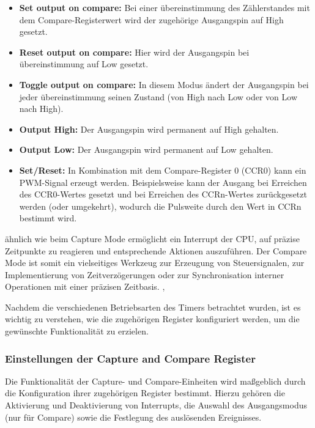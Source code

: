 \begin{itemize}
	\item \textbf{Set output on compare:} Bei einer \"ubereinstimmung des Z\"ahlerstandes mit dem Compare-Registerwert wird der zugeh\"orige Ausgangspin auf High gesetzt.

	\item \textbf{Reset output on compare:} Hier wird der Ausgangspin bei \"ubereinstimmung auf Low gesetzt.

	\item \textbf{Toggle output on compare:} In diesem Modus \"andert der Ausgangspin bei jeder \"ubereinstimmung seinen Zustand (von High nach Low oder von Low nach High).

	\item \textbf{Output High:} Der Ausgangspin wird permanent auf High gehalten.

	\item \textbf{Output Low:} Der Ausgangspin wird permanent auf Low gehalten.

	\item \textbf{Set/Reset:} In Kombination mit dem Compare-Register 0 (CCR0) kann ein PWM-Signal erzeugt werden. Beispielsweise kann der Ausgang bei Erreichen des CCR0-Wertes gesetzt und bei Erreichen des CCRn-Wertes zur\"uckgesetzt werden (oder umgekehrt), wodurch die Pulsweite durch den Wert in CCRn bestimmt wird.
\end{itemize}

\"ahnlich wie beim Capture Mode erm\"oglicht ein Interrupt der CPU, auf pr\"azise Zeitpunkte zu reagieren und entsprechende Aktionen auszuf\"uhren. Der Compare Mode ist somit ein vielseitiges Werkzeug zur Erzeugung von Steuersignalen, zur Implementierung von Zeitverz\"ogerungen oder zur Synchronisation interner Operationen mit einer pr\"azisen Zeitbasis. , 

Nachdem die verschiedenen Betriebsarten des Timers betrachtet wurden, ist es wichtig zu verstehen, wie die zugeh\"origen Register konfiguriert werden, um die gew\"unschte Funktionalit\"at zu erzielen.


\subsubsection{Einstellungen der Capture and Compare Register}
\label{CC_Register}

Die Funktionalit\"at der Capture- und Compare-Einheiten wird ma{\ss}geblich durch die Konfiguration ihrer zugeh\"origen Register bestimmt. Hierzu geh\"oren die Aktivierung und Deaktivierung von Interrupts, die Auswahl des Ausgangsmodus (nur f\"ur Compare) sowie die Festlegung des ausl\"osenden Ereignisses.

